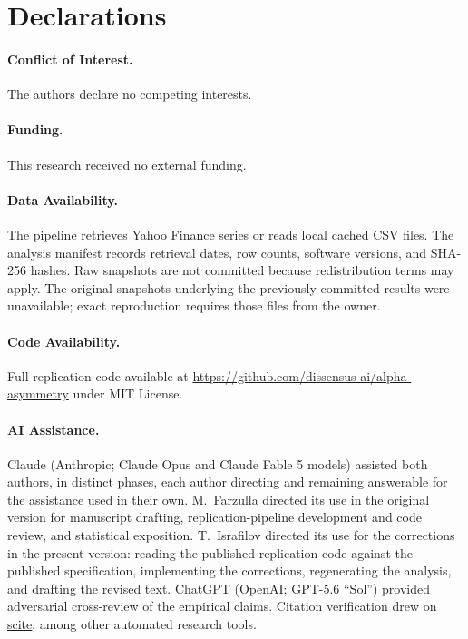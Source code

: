 \documentclass[11pt]{article}
\begin{document}
\section*{Declarations}

\paragraph{Conflict of Interest.} The authors declare no competing interests.

\paragraph{Funding.} This research received no external funding.

\paragraph{Data Availability.} The pipeline retrieves Yahoo Finance series or reads local cached CSV files. The analysis manifest records retrieval dates, row counts, software versions, and SHA-256 hashes. Raw snapshots are not committed because redistribution terms may apply. The original snapshots underlying the previously committed results were unavailable; exact reproduction requires those files from the owner.

\paragraph{Code Availability.} Full replication code available at \url{https://github.com/dissensus-ai/alpha-asymmetry} under MIT License.

\paragraph{AI Assistance.} Claude (Anthropic; Claude Opus and Claude Fable 5 models) assisted both authors, in distinct phases, each author directing and remaining answerable for the assistance used in their own. M.\ Farzulla directed its use in the original version for manuscript drafting, replication-pipeline development and code review, and statistical exposition. T.\ Israfilov directed its use for the corrections in the present version: reading the published replication code against the published specification, implementing the corrections, regenerating the analysis, and drafting the revised text. ChatGPT (OpenAI; GPT-5.6 ``Sol'') provided adversarial cross-review of the empirical claims. Citation verification drew on \href{https://scite.ai}{scite}, among other automated research tools.
\end{document}
